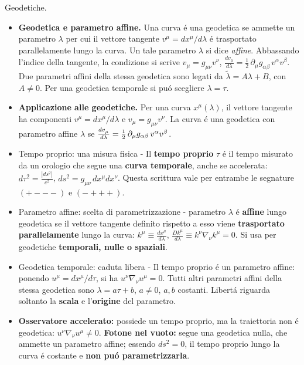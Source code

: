 \begin{frame}[t]{Geodetiche.}\small\raggedright
    \begin{itemize}
        \item \textbf{Geodetica e parametro affine.} Una curva \'e una geodetica se ammette un parametro \(\lambda\) per cui il vettore tangente \(v^\mu=dx^\mu/d\lambda\) \'e trasportato parallelamente lungo la curva. Un tale parametro \(\lambda\) si dice \emph{affine}. Abbassando l'indice della tangente, la condizione si scrive $v_\mu=g_{\mu\nu}v^\nu$, $\frac{dv_\mu}{d\lambda}=\frac12\,\partial_\mu g_{\alpha\beta}\,v^\alpha v^\beta$. Due parametri affini della stessa geodetica sono legati da \(\tilde\lambda=A\lambda+B\), con \(A\ne0\). Per una geodetica temporale si pu\'o scegliere \(\lambda=\tau\).
    \item \textbf{Applicazione alle geodetiche.} Per una curva \(x^\mu(\lambda)\), il vettore tangente ha componenti \(v^\mu=dx^\mu/d\lambda\) e \(v_\mu=g_{\mu\nu}v^\nu\). La curva \'e una geodetica con parametro affine \(\lambda\) se $\TDy{\lambda}{\tensor{v}{_{\mu}}}=\frac12\,\partial_\mu g_{\alpha\beta}\,v^\alpha v^\beta$.
    \item Tempo proprio: una misura fisica - Il \textbf{tempo proprio} $\tau$ \'e il tempo misurato da un orologio che segue una \textbf{curva temporale}, anche se accelerata: $d\tau^2=\frac{|ds^2|}{c^2}$, $ds^2=g_{\mu\nu}\,dx^\mu dx^\nu$.
Questa scrittura vale per entrambe le segnature $(+---)$ e $(-+++)$.
\item Parametro affine: scelta di parametrizzazione - parametro $\lambda$ \'e \textbf{affine} lungo geodetica se il vettore tangente definito rispetto a esso viene \textbf{trasportato parallelamente} lungo la curva: $k^\mu\equiv\frac{dx^\mu}{d\lambda}$, $\frac{Dk^\mu}{d\lambda}\equiv k^\nu\nabla_\nu k^\mu=0$. Si usa per geodetiche \textbf{temporali, nulle o spaziali}.
\item {\footnotesize Geodetica temporale: caduta libera - Il tempo proprio \'e un parametro affine: ponendo $u^\mu=dx^\mu/d\tau$, si ha $u^\nu\nabla_\nu u^\mu=0$. Tutti altri parametri affini della stessa geodetica sono $\boxed{\lambda=a\tau+b}$, $ a\ne0$, $a,b$ costanti. Libert\'a riguarda soltanto la \textbf{scala} e l'\textbf{origine} del parametro.\par}
\item {\footnotesize \textbf{Osservatore accelerato:} possiede un tempo proprio, ma la traiettoria non \'e geodetica: $u^\nu\nabla_\nu u^\mu\ne0$. \textbf{Fotone nel vuoto:} segue una geodetica nulla, che ammette un parametro affine; essendo $ds^2=0$, il tempo proprio lungo la curva \'e costante e \textbf{non pu\'o parametrizzarla}.\par}

\end{itemize}
\end{frame}

